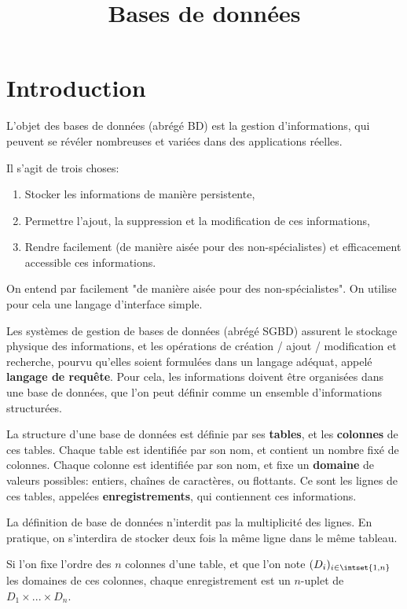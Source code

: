 \documentclass[a4paper]{scrartcl}
\title{Bases de données}
\author{}
\date{}
\begin{document}
	\maketitle
	\section{Introduction}
		L'objet des bases de données (abrégé BD) est la gestion d'informations,
		qui peuvent se révéler nombreuses et variées dans des applications réelles.

		Il s'agit de trois choses:
		\begin{enumerate}
			\item Stocker les informations de manière persistente,
			\item Permettre l'ajout, la suppression et la modification de ces informations,
			\item Rendre facilement (de manière aisée pour des non-spécialistes) et efficacement accessible ces informations.
		\end{enumerate}

		On entend par facilement "de manière aisée pour des non-spécialistes". 
		On utilise pour cela une langage d'interface simple.

		Les systèmes de gestion de bases de données (abrégé SGBD) assurent le stockage physique des informations,
		et les opérations de création / ajout / modification et recherche, 
		pourvu qu'elles soient formulées dans un langage adéquat, appelé \textbf{langage de requête}.
		Pour cela, les informations doivent être organisées dans une base de données, 
		que l'on peut définir comme un ensemble d'informations structurées.

		La structure d'une base de données est définie par ses \textbf{tables}, et les \textbf{colonnes} de ces tables.
		Chaque table est identifiée par son nom, et contient un nombre fixé de colonnes.
		Chaque colonne est identifiée par son nom, et fixe un \textbf{domaine} de valeurs possibles:
		entiers, chaînes de caractères, ou flottants.
		Ce sont les lignes de ces tables, appelées \textbf{enregistrements}, qui contiennent ces informations.

		\rem La définition de base de données n'interdit pas la multiplicité des lignes. 
		En pratique, on s'interdira de stocker deux fois la même ligne dans le même tableau.

		Si l'on fixe l'ordre des $n$ colonnes d'une table, et que l'on note 
		$(D_i)_{i\in\intset{1,n}}$ les domaines de ces colonnes, chaque enregistrement est un $n$-uplet
		de $D_1\times...\times D_n$.
\end{document}
